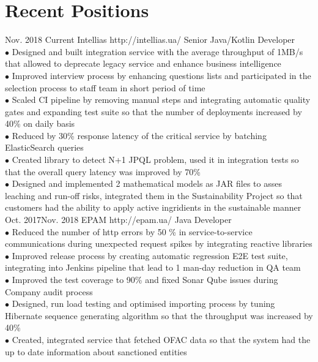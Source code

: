 \documentclass[10pt]{article} %
\begin{document}
\section{Recent Positions}
\job
{Nov. 2018 }{ Current}
{Intellias}
{http://intellias.ua/}
{Senior Java/Kotlin Developer}
{
\textbf{}   
\\$\bullet$ Designed and built integration service with the average throughput of 1MB/s that allowed to deprecate legacy service and enhance business intelligence
\\$\bullet$ Improved interview process by enhancing questions lists and participated in the selection process to staff team in short period of time 
\\$\bullet$ Scaled CI pipeline by removing manual steps and integrating automatic quality gates and expanding test suite so that the number of deployments increased by 40\% on daily basis 
\\$\bullet$ Reduced by 30\% response latency of the critical service by batching ElasticSearch queries 
\\$\bullet$ Created library to detect N+1 JPQL problem, used it in integration tests so that the overall query latency was improved by 70\% 
\\$\bullet$ Designed and implemented 2 mathematical models as JAR files to asses leaching and run-off risks, 
integrated them in the Sustainability Project so that customers had the ability to apply active ingridients in the sustainable manner
 }
\job
{Oct. 2017}{Nov. 2018}
{EPAM}
{http://epam.ua/}
{Java Developer}
{
\textbf{}    
\\$\bullet$ Reduced the number of http errors by 50 \% in service-to-service communications during unexpected request spikes by integrating reactive libraries 
\\$\bullet$ Improved release process by creating automatic regression E2E test suite, integrating into Jenkins pipeline that lead to 1 man-day reduction in QA team 
\\$\bullet$ Improved the test coverage to 90\% and fixed Sonar Qube issues during Company audit process
\\$\bullet$ Designed, run load testing and optimised importing process by tuning Hibernate sequence generating algorithm so that the throughput was increased by 40\%
\\$\bullet$ Created, integrated service that fetched OFAC data so that the system had the up to date information about sanctioned entities
 }
\end{document}
